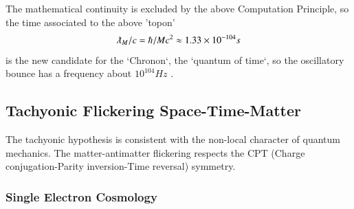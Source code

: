\documentclass[twoside,draft]{article}
\begin{document}
\begin{sloppypar}
{The mathematical continuity is excluded by the above Computation Principle, so the time associated
to the above 'topon' 
$$\lambdabar_{M} /c = \hbar/Mc^2 \approx 1.33 \times 10^{-104}s$$
is the new candidate for the `Chronon`, the `quantum of time`, so the
oscillatory bounce has a frequency about $10^{104}Hz $ \cite{Sanchez2}.

\subsection{Tachyonic Flickering Space-Time-Matter}

The tachyonic hypothesis is consistent with the non-local character of quantum mechanics. The
matter-antimatter flickering respects the CPT (Charge conjugation-Parity inversion-Time reversal) symmetry.

\subsubsection{Single Electron Cosmology}

}
\end{sloppypar}
\end{document}

